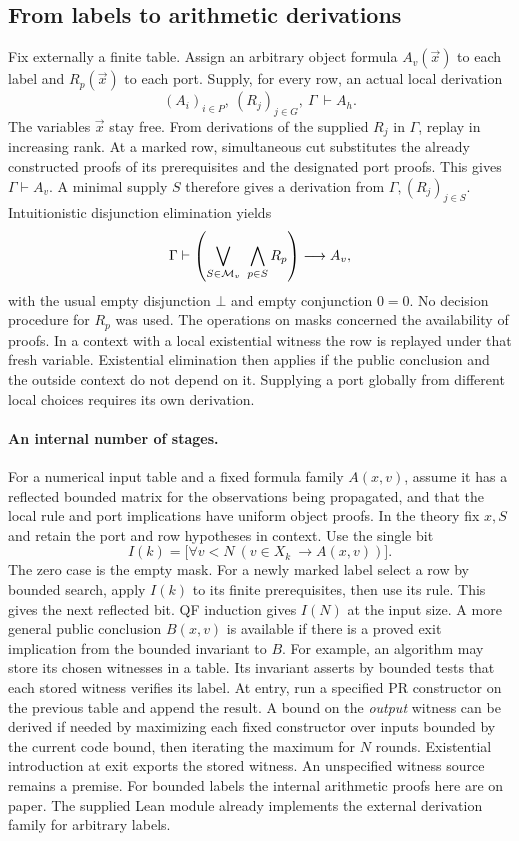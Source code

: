 \subsection{From labels to arithmetic derivations}
Fix externally a finite table. Assign an arbitrary object formula $A_v(\vec x)$ to each label and $R_p(\vec x)$ to each port. Supply, for every row, an actual local derivation
\[
 (A_i)_{i\in P},\ (R_j)_{j\in G},\ \Gamma\ \vdash A_h .
\]
The variables $\vec x$ stay free. From derivations of the supplied $R_j$ in $\Gamma$, replay in increasing rank. At a marked row, simultaneous cut substitutes the already constructed proofs of its prerequisites and the designated port proofs. This gives $\Gamma\vdash A_v$. A minimal supply $S$ therefore gives a derivation from $\Gamma,(R_j)_{j\in S}$. Intuitionistic disjunction elimination yields
\[
 \Gamma\vdash
 \left(\bigvee_{S\in{\cal M}_v}\ \bigwedge_{p\in S}R_p\right)
       \longrightarrow A_v ,
\]
with the usual empty disjunction $\bot$ and empty conjunction $0=0$. No decision procedure for $R_p$ was used. The operations on masks concerned the availability of proofs. In a context with a local existential witness the row is replayed under that fresh variable. Existential elimination then applies if the public conclusion and the outside context do not depend on it. Supplying a port globally from different local choices requires its own derivation.

\paragraph{An internal number of stages.}
For a numerical input table and a fixed formula family $A(x,v)$, assume it has a reflected bounded matrix for the observations being propagated, and that the local rule and port implications have uniform object proofs. In the theory fix $x,S$ and retain the port and row hypotheses in context. Use the single bit
\[
 I(k)=\Big[\forall v<N\ (v\in X_k\ \longrightarrow A(x,v))\Big].
\]
The zero case is the empty mask. For a newly marked label select a row by bounded search, apply $I(k)$ to its finite prerequisites, then use its rule. This gives the next reflected bit. QF induction gives $I(N)$ at the input size. A more general public conclusion $B(x,v)$ is available if there is a proved exit implication from the bounded invariant to $B$. For example, an algorithm may store its chosen witnesses in a table. Its invariant asserts by bounded tests that each stored witness verifies its label. At entry, run a specified PR constructor on the previous table and append the result. A bound on the \emph{output} witness can be derived if needed by maximizing each fixed constructor over inputs bounded by the current code bound, then iterating the maximum for $N$ rounds. Existential introduction at exit exports the stored witness. An unspecified witness source remains a premise. For bounded labels the internal arithmetic proofs here are on paper. The supplied Lean module already implements the external derivation family for arbitrary labels.

